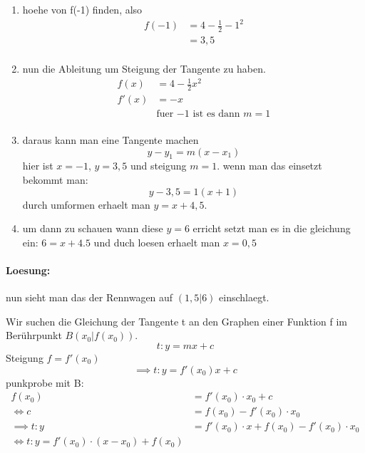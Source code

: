 \documentclass{report}
\begin{document}
\begin{multicols}{2}

  \begin{enumerate}
    \item hoehe von f(-1) finden, also 
      \begin{align*}
        f(-1)&=4-\frac{1}{2}-1^2\\
        &=3,5\\
      \end{align*}
    \item nun die Ableitung um Steigung der Tangente zu haben.
      \begin{align*}
        f(x)&=4-\frac{1}{2}x^2\\
        f'(x)&=-x\\
             &\text{fuer $-1$ ist es dann $m=1$}\\
      \end{align*}
    \item daraus kann man eine Tangente machen
      \[y-y_1=m(x-x_1)\]
      hier ist $x=-1$, $y=3,5$ und steigung $m=1$. wenn man das einsetzt bekommt man:
      \[y-3,5=1(x+1)\]
      durch umformen erhaelt man $y=x+4,5$.
    \item um dann zu schauen wann diese $y=6$ erricht setzt man es in die
      gleichung ein: $6=x+4.5$ und duch loesen erhaelt man $x=0,5$
  \end{enumerate}
  \paragraph{Loesung:} nun sieht man das der Rennwagen auf $(1,5|6)$ einschlaegt.
\end{multicols}



\begin{tcolorbox}[colback=blue!10!white,colframe=blue!50!black,title=Tangentengleichung]
  Wir suchen die Gleichung der Tangente t an den Graphen einer Funktion f im Ber\"uhrpunkt $B(x_0|f(x_0))$.
  \[t:y=mx+c\]
  Steigung $f=f'(x_0)$
  \[\implies t:y=f'(x_0)x+c\]
  punkprobe mit B:
  \begin{align*}
    f(x_0)&=f'(x_0)\cdot x_0+c\\
    \Leftrightarrow c&=f(x_0)-f'(x_0)\cdot x_0\\
    \implies t:y&=f'(x_0)\cdot x+f(x_0)-f'(x_0)\cdot x_0\\
    \Leftrightarrow t: y=f'(x_0)\cdot (x-x_0)+f(x_0)
  \end{align*}
\end{tcolorbox}
\end{document}
